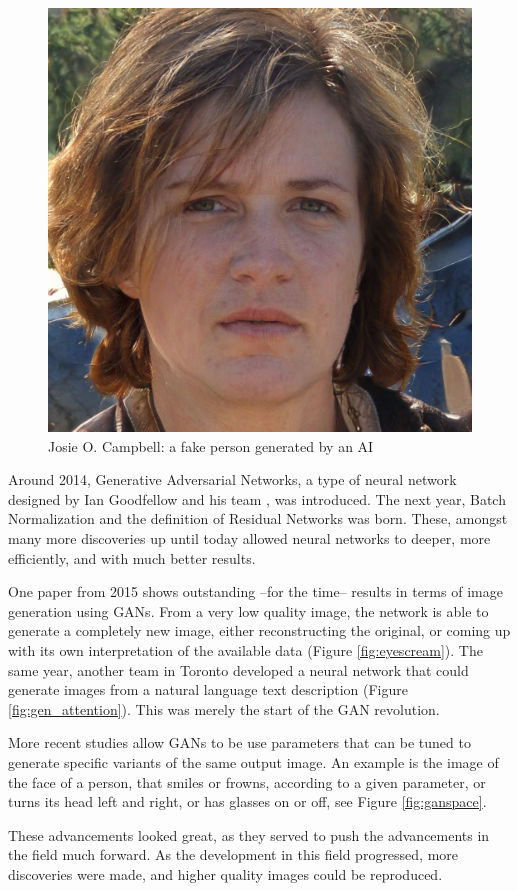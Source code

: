 \begin{figure}
    \includegraphics[width=0.5 \linewidth]{05_GANs/joiseocampbell.jpg}
    \caption{Josie O. Campbell: a fake person generated by an AI}
    \label{fig:fakeperson}
\end{figure}

Around 2014, Generative Adversarial Networks, a type of neural network designed by Ian Goodfellow and his team \cite{goodfellow2014generative}, was introduced. The next year, Batch Normalization \cite{ioffe2015batch} and the definition of Residual Networks \cite{he2015deep} was born. These, amongst many more discoveries up until today allowed neural networks to deeper, more efficiently, and with much better results.

One paper from 2015 \cite{denton2015deep} shows outstanding --for the time-- results in terms of image generation using GANs. From a very low quality image, the network is able to generate a completely new image, either reconstructing the original, or coming up with its own interpretation of the available data (Figure \ref{fig:eyescream}). The same year, another team in Toronto developed a neural network that could generate images from a natural language text description (Figure \ref{fig:gen_attention}). This was merely the start of the GAN revolution.

More recent studies allow GANs to be use parameters that can be tuned to generate specific variants of the same output image. An example is the image of the face of a person, that smiles or frowns, according to a given parameter, or turns its head left and right, or has glasses on or off, see Figure \ref{fig:ganspace}.

These advancements looked great, as they served to push the advancements in the field much forward. As the development in this field progressed, more discoveries were made, and higher quality images could be reproduced. 

